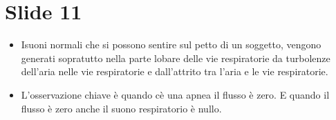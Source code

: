 \section{Slide 11}

\begin{itemize}
  \item 
    Isuoni normali che si possono sentire sul petto di un soggetto, vengono generati sopratutto nella parte lobare delle vie respiratorie da turbolenze dell'aria nelle vie respiratorie e dall'attrito tra l'aria e le vie respiratorie.
  \item
    L'osservazione chiave \`e quando c\`e una apnea il flusso \`e zero.
    E quando il flusso \`e zero anche il suono respiratorio \`e nullo.
\end{itemize}
% 

